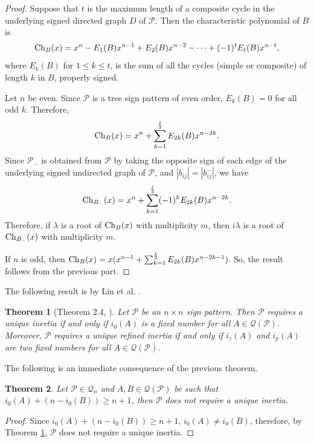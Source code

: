 \documentclass[a4paper, 10pt]{article}
\newtheorem{theorem}{Theorem}[section]
\numberwithin{equation}{section}
\def\Ch{{\rm Ch}}
\begin{document}
	\begin{proof}
		Suppose that $t$ is the maximum length of a composite cycle in the underlying signed directed graph $D$ of $\mathcal{P}$. Then the characteristic polynomial of $B$ is $$\Ch_B(x)=x^n-E_1(B)x^{n-1}+E_2(B)x^{n-2}-\cdots+(-1)^tE_t(B)x^{n-t},$$ where $E_k(B)$ for $1\leq k\leq t$, is the sum of all the cycles (simple or composite) of length $k$ in $B$, properly signed. 
		
		Let $n$ be even. Since $\mathcal{P}$ is a tree sign pattern of even order, $E_k(B)=0$ for all odd $k$. Therefore, $$\Ch_B(x)=x^n+\sum_{k=1}^{\frac{t}{2}}E_{2k}(B)x^{n-2k}.$$
		Since $\mathcal{P}_-$ is obtained from $\mathcal{P}$ by taking the opposite sign of each edge of the underlying signed undirected graph of $\mathcal{P}$, and $|b_{ij}|=|b_{ij}^-|$, we have 
		$$\Ch_{B_-}(x)=x^n+\sum_{k=1}^{\frac{t}{2}}(-1)^kE_{2k}(B)x^{n-2k}.$$
		Therefore, if $\lambda$ is a root of $\Ch_B(x)$ with multiplicity $m$, then $i\lambda$ is a root of $\Ch_{B_-}(x)$ with multiplicity $m$.
		
		If $n$ is odd, then $\Ch_B(x) = x(x^{n-1}+\sum_{k=1}^{\frac{t}{2}}E_{2k}(B)x^{n-2k-1})$. So, the result follows from the previous part.
	\end{proof}
	
	
	
	The following result is by Lin et al. \cite{2018}.
	
	
	\begin{theorem} [Theorem 2.4, \cite{2018}]\label{th4}
		Let $\mathcal{P}$ be an $n \times n$ sign pattern. Then $\mathcal{P}$ requires a unique inertia if and only if $i_0(A)$ is a fixed number for all $A \in \mathcal{Q}(\mathcal{P})$. Moreover, $\mathcal{P}$ requires a unique refined inertia if and only if $i_z(A)$ and $i_p(A)$ are two fixed numbers for all $A \in \mathcal{Q}(\mathcal{P})$.
	\end{theorem}
	
	The following is an immediate consequence of the previous theorem.
	\begin{theorem}\label{lem2}
		Let $\mathcal{P}\in \mathcal{Q}_n$ and $A,B\in \mathcal{Q}(\mathcal{P})$ be such that $i_0(A)+(n-i_0(B))\geq n+1$, then $\mathcal{P}$ does not require a unique inertia. 
	\end{theorem}
	\begin{proof}
		Since $i_0(A)+(n-i_0(B))\geq n+1$, $i_0(A)\neq i_0(B)$, therefore, by Theorem \ref{th4}, $\mathcal{P}$ does not require a unique inertia.
	\end{proof}
	
\end{document}

